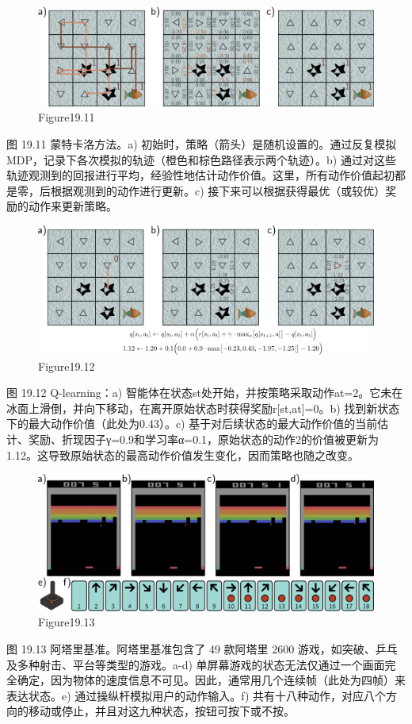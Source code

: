 \begin{figure}[h!]
\centering
\includegraphics[width=0.7\linewidth]{png/chapter19/ReinforceMC.png}
\caption{Figure19.11}
\end{figure}
图 19.11 蒙特卡洛方法。a) 初始时，策略（箭头）是随机设置的。通过反复模拟 MDP，记录下各次模拟的轨迹（橙色和棕色路径表示两个轨迹）。b) 通过对这些轨迹观测到的回报进行平均，经验性地估计动作价值。这里，所有动作价值起初都是零，后根据观测到的动作进行更新。c) 接下来可以根据获得最优（或较优）奖励的动作来更新策略。

\begin{figure}[h!]
\centering
\includegraphics[width=0.7\linewidth]{png/chapter19/ReinforceTD.png}
\caption{Figure19.12}
\end{figure}
图 19.12 Q-learning：a) 智能体在状态st处开始，并按策略采取动作at=2。它未在冰面上滑倒，并向下移动，在离开原始状态时获得奖励r[st,at]=0。b) 找到新状态下的最大动作价值（此处为0.43）。c) 基于对后续状态的最大动作价值的当前估计、奖励、折现因子γ=0.9和学习率α=0.1，原始状态的动作2的价值被更新为1.12。这导致原始状态的最高动作价值发生变化，因而策略也随之改变。


\begin{figure}[h!]
\centering
\includegraphics[width=0.7\linewidth]{png/chapter19/ReinforceDQL.png}
\caption{Figure19.13}
\end{figure}
图 19.13 阿塔里基准。阿塔里基准包含了 49 款阿塔里 2600 游戏，如突破、乒乓及多种射击、平台等类型的游戏。a-d) 单屏幕游戏的状态无法仅通过一个画面完全确定，因为物体的速度信息不可见。因此，通常用几个连续帧（此处为四帧）来表达状态。e) 通过操纵杆模拟用户的动作输入。f) 共有十八种动作，对应八个方向的移动或停止，并且对这九种状态，按钮可按下或不按。


